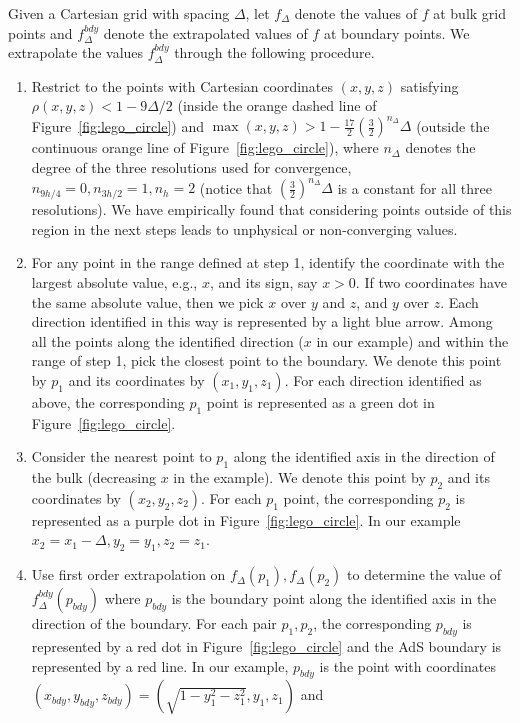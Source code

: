 \documentclass[aps,letterpaper,twocolumn,nofootinbib]{revtex4}
\numberwithin{equation}{section}
\begin{document}
Given a Cartesian grid with spacing $\Delta$, let $f_\Delta$ denote the values of $f$ at bulk grid points and $f^{bdy}_{\Delta}$ denote the extrapolated values of $f$ at boundary points. 
We extrapolate the values $f^{bdy}_{\Delta}$ through the following procedure.
 \begin{enumerate}
 \item Restrict to the points with Cartesian coordinates $(x,y,z)$ satisfying $\rho(x,y,z)<1-9\Delta/2$ (inside the orange dashed line of Figure~\ref{fig:lego_circle}) and $\max(x,y,z)>1-\frac{17}{2}\left(\frac{3}{2}\right)^{n_\Delta}\Delta$ (outside the continuous orange line of Figure~\ref{fig:lego_circle}), where $n_\Delta$ denotes the degree of the three resolutions used for convergence, $n_{9h/4}=0,n_{3h/2}=1,n_{h}=2$ (notice that $\left(\frac{3}{2}\right)^{n_\Delta}\Delta$ is a constant for all three resolutions). We have empirically found that considering points outside of this region in the next steps leads to unphysical or non-converging values.
 \item For any point in the range defined at step 1, identify the coordinate with the largest absolute value, e.g., $x$, and its sign, say $x>0$. If two coordinates have the same absolute value, then we pick $x$ over $y$ and $z$, and $y$ over $z$. Each direction identified in this way is represented by a light blue arrow. Among all the points along the identified direction ($x$ in our example) and within the range of step 1, pick the closest point to the boundary. We denote this point by $p_1$ and its coordinates by $(x_1,y_1,z_1)$. For each direction identified as above, the corresponding $p_1$ point is represented as a green dot in Figure~\ref{fig:lego_circle}.
 \item Consider the nearest point to $p_1$ along the identified axis in the direction of the bulk (decreasing $x$ in the example). We denote this point by $p_2$ and its coordinates by $(x_2,y_2,z_2)$. For each $p_1$ point, the corresponding $p_2$ is represented as a purple dot in Figure~\ref{fig:lego_circle}. In our example $x_2=x_1-\Delta,y_2=y_1,z_2=z_1$.
 \item Use first order extrapolation on $f_\Delta(p_1),f_\Delta(p_{2})$ to determine the value of $f^{bdy}_{\Delta}(p_{bdy})$ where $p_{bdy}$ is the boundary point along the identified axis in the direction of the boundary. 
For each pair $p_1,p_2$, the corresponding $p_{bdy}$ is represented by a red dot in Figure~\ref{fig:lego_circle} and the AdS boundary is represented by a red line.
In our example, $p_{bdy}$ is the point with coordinates $(x_{bdy},y_{bdy},z_{bdy})=(\sqrt{1-y_1^2-z_1^2},y_1,z_1)$ and

\end{enumerate}
\end{document}
